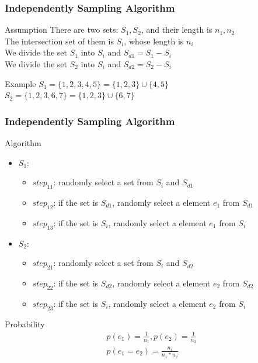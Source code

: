 \documentclass[notheorems, aspectratio=54]{beamer}
\begin{document}
\begin{frame}
    \frametitle{Independently Sampling Algorithm}
    \begin{block}{Assumption}
        There are two sets: $S_1, S_2$, and their length is $n_1, n_2$ \\
        The intersection set of them is $S_i$, whose length is $n_i$ \\
        We divide the set $S_1$ into $S_i$ and $S_{d1} = S_1 - S_i$ \\
        We divide the set $S_2$ into $S_i$ and $S_{d2} = S_2 - S_i$
    \end{block}
    
    \begin{block}{Example}
        $S_1 = \{1,2,3,4,5\} = \{1,2,3\} \cup \{4,5\}$ \\
        $S_2 = \{1,2,3,6,7\} = \{1,2,3\} \cup \{6,7\}$
    \end{block}
    
\end{frame}

\begin{frame}
    \frametitle{Independently Sampling Algorithm}
    \begin{block}{Algorithm}
        \begin{itemize}
            \item $S_1$:
            \begin{itemize}
                \item $step_{11}$: randomly select a set from $S_i$ and $S_{d1}$
                \item $step_{12}$: if the set is $S_{d1}$, randomly select a element $e_1$ from $S_{d1}$
                \item $step_{13}$: if the set is $S_i$, randomly select a element $e_1$ from $S_i$
            \end{itemize}
            \item $S_2$:
            \begin{itemize}
                \item $step_{21}$: randomly select a set from $S_i$ and $S_{d2}$
                \item $step_{22}$: if the set is $S_{d2}$, randomly select a element $e_2$ from $S_{d2}$
                \item $step_{23}$: if the set is $S_i$, randomly select a element $e_2$ from $S_i$
            \end{itemize}
        \end{itemize}
    \end{block}
    \begin{block}{Probability}
        \begin{equation}
            \begin{aligned}
                p(e_1) = \frac{1}{n_1},p(e_2) = \frac{1}{n_2}\\
                p(e_1 = e_2) = \frac{n_i}{n_1*n_2}
            \end{aligned}
        \end{equation}
    \end{block}
\end{frame}
\end{document}
